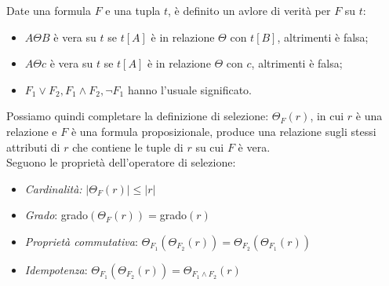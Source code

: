 \documentclass[12pt]{report}
\begin{document}
 	Date una formula $F$ e una tupla $t$, è definito un avlore di verità per $F$ su $t$:
 	\begin{itemize}
 		\item $A\Theta B$ è vera su $t$ se $t[A]$ è in relazione $\Theta$ con $t[B]$, altrimenti è falsa;
 		\item $A\Theta c$ è vera su $t$ se $t[A]$ è in relazione $\Theta$ con $c$, altrimenti è falsa;
 		\item $F_1 \vee F_2, F_1 \wedge F_2, \neg F_1$ hanno l'usuale significato.
 	\end{itemize}
 	Possiamo quindi completare la definizione di selezione: $\Theta_F(r)$, in cui $r$ è una relazione e $F$ è una formula proposizionale, produce una relazione sugli stessi attributi di $r$ che contiene le tuple di $r$ su cui $F$ è vera. \\
 	Seguono le proprietà dell'operatore di selezione:
 	\begin{itemize}
 	\item \textit{Cardinalità:} $|\Theta_F(r)| \leq |r|$
 	\item \textit{Grado}: grado$(\Theta_F(r))=$grado$(r)$
 	\item \textit{Proprietà commutativa}: $\Theta_{F_1}(\Theta_{F_2}(r)) = \Theta_{F_2}(\Theta_{F_1}(r))$
 	\item \textit{Idempotenza}: $\Theta_{F_1}(\Theta_{F_2}(r)) = \Theta_{F_1 \wedge F_2}(r)$
 	\end{itemize}
\end{document}
